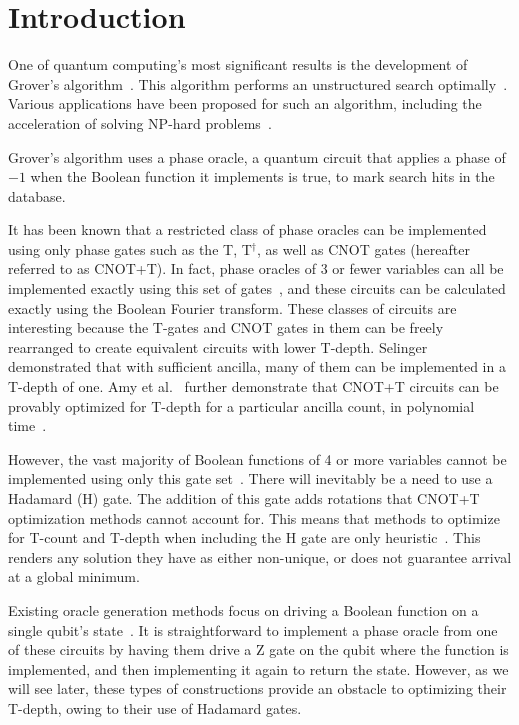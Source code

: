 \section{Introduction}
One of quantum computing's most significant results is the development of Grover's
algorithm~\cite{bib-grover1996fast}. This algorithm performs an unstructured search
optimally~\cite{bib-zaika-grov-opt}. Various applications have
been proposed for such an algorithm, including the acceleration of solving NP-hard
problems~\cite{bib-williams-grover-np}.

Grover's algorithm uses a phase oracle, a quantum circuit that applies a phase of
$-1$ when the Boolean function it implements is true, to mark search hits in the
database.

It has been known that a restricted class of phase oracles can be implemented
using only phase gates such as the T, T$^\dagger$, as well as CNOT gates (hereafter
referred to as CNOT+T). In fact, phase oracles of 3 or fewer variables can all be
implemented exactly using this set of gates~\cite{bib-amy-cnot}, and these circuits
can be calculated exactly using the Boolean Fourier transform. These classes of
circuits are interesting because the T-gates and CNOT gates in them can be freely rearranged
to create equivalent circuits with lower T-depth. Selinger~\cite{bib-selinger-tdepthone}
demonstrated that with sufficient ancilla, many of them can be implemented in a
T-depth of one. Amy et al.~\cite{amy-meet-in-middle} further demonstrate that CNOT+T
circuits can be provably optimized for T-depth for a particular ancilla
count, in polynomial time~\cite{bib-amy-matroid}.

However, the vast majority of Boolean functions of 4 or more variables cannot be
implemented using only this gate set~\cite{bib-amy-rm}. There will inevitably be a need to use
a Hadamard (H) gate. The addition of this gate adds rotations that CNOT+T optimization
methods cannot account for. This means that methods to optimize for T-count and T-depth when
including the H gate are only heuristic~\cite{amy-meet-in-middle,bib-amy-matroid,bib-amy-rm}.
This renders any solution they have as either non-unique, or does not guarantee arrival
at a global minimum.

Existing oracle generation methods focus on driving a Boolean function on a single qubit's
state~\cite{bib-meuli-mult}. It is straightforward to implement a phase oracle from one of
these circuits by having them drive a Z gate on the qubit where the function is implemented,
and then implementing it again to return the state. However, as we will see later, these
types of constructions provide an obstacle to optimizing their T-depth, owing to their use
of Hadamard gates.

